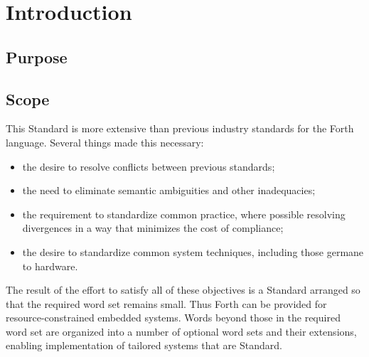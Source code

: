 \label{annex:rationale}

\ifanswerfiles
\fi

\newcommand{\readrationale}[1]{%
	\ifinline
		\fbox{\parbox{\linewidth}{\slshape
		In the \emph{review} (r) version of the document the
		rationale text for each of the words is given in with
		the main definition of the word.  The rationale for
		words in the \textbf{#1} wordset will appear here in
		the final document.
		}}
	\else
		\defersection{}
		
		\stepsection
	\fi
}

\section{Introduction} %

\subsection{Purpose} %

\subsection{Scope} %

This Standard is more extensive than previous industry standards
for the Forth language. Several things made this necessary:

\begin{itemize}
\item the desire to resolve conflicts between previous standards;
\item the need to eliminate semantic ambiguities and other
	inadequacies;
\item the requirement to standardize common practice, where possible
	resolving divergences in a way that minimizes the cost of
	compliance;
\item the desire to standardize common system techniques, including
	those germane to hardware.
\end{itemize}

The result of the effort to satisfy all of these objectives is a
Standard arranged so that the required word set remains small. Thus
 Forth can be provided for resource-constrained embedded systems.
Words beyond those in the required word set are organized into a
number of optional word sets and their extensions, enabling
implementation of tailored systems that are Standard.

